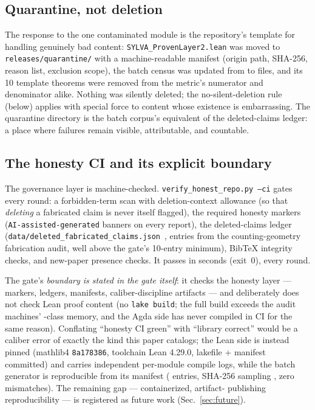 \subsection{Quarantine, not deletion}
\label{sec:quarantine}
The response to the one contaminated module is the repository's
template for handling genuinely bad content: \texttt{SYLVA\_ProvenLayer2.lean}
was moved to \texttt{releases/quarantine/} with a machine-readable
manifest (origin path, SHA-256, reason list, exclusion scope), the
batch census was updated from  to
 files, and its 10 template theorems were removed
from the metric's numerator and denominator alike. Nothing was
silently deleted; the no-silent-deletion rule (below) applies with
special force to content whose existence is embarrassing. The
quarantine directory is the batch corpus's equivalent of the
deleted-claims ledger: a place where failures remain visible,
attributable, and countable.

\subsection{The honesty CI and its explicit boundary}
\label{sec:ci}
The governance layer is machine-checked.
\texttt{verify\_honest\_repo.py --ci} gates every round: a
forbidden-term scan with deletion-context allowance (so that
\emph{deleting} a fabricated claim is never itself flagged), the
required honesty markers (\texttt{AI-assisted-generated} banners
on every report), the deleted-claims ledger
(\texttt{data/deleted\_fabricated\_claims.json}~\cite{sylvafabrication2026},
 entries from the counting-geometry fabrication audit,
well above the gate's 10-entry minimum), BibTeX integrity
checks, and new-paper presence checks. It passes in seconds
(exit~0), every round.

The gate's \emph{boundary is stated in the gate itself}: it
checks the honesty layer --- markers, ledgers, manifests,
caliber-discipline artifacts --- and deliberately does not check
Lean proof content (no \texttt{lake build}; the full build
exceeds the audit machines' -class memory, and the Agda
side has never compiled in CI for the same reason). Conflating ``honesty CI green'' with ``library correct''
would be a caliber error of exactly the kind this paper catalogs;
the Lean side is instead pinned (mathlib4
\texttt{8a178386}, toolchain Lean 4.29.0, lakefile + manifest
committed) and carries independent per-module compile logs, while
the batch generator is reproducible from its manifest
( entries, SHA-256 sampling , zero
mismatches). The remaining gap --- containerized, artifact-
publishing reproducibility --- is registered as future work
(Sec.~\ref{sec:future}).
